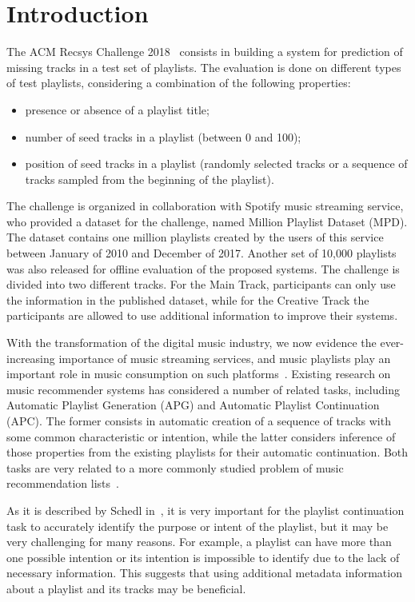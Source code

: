 \section{Introduction}

The ACM Recsys Challenge 2018~\cite{RecSysChallenge2018} consists in building a system for prediction of missing tracks in a test set of playlists. The evaluation is done on different types of test playlists, considering a combination of the following properties:
\begin{itemize}
\item presence or absence of a playlist title;
\item number of seed tracks in a playlist (between 0 and 100);
\item position of seed tracks in a playlist (randomly selected tracks or a sequence of tracks sampled from the beginning of the playlist).
\end{itemize}
The challenge is organized in collaboration with Spotify music streaming service, who provided a dataset for the challenge, named Million Playlist Dataset (MPD). The dataset contains one million playlists created by the users of this service between January of 2010 and December of 2017. Another set of 10,000 playlists was also released for offline evaluation of the proposed systems.
The challenge is divided into two different tracks. For the Main Track, participants can only use the information in the published dataset, while for the Creative Track the participants are allowed to use additional information to improve their systems.

With the transformation of the digital music industry, we now evidence the ever-increasing importance of music streaming services, and music playlists play an important role in music consumption on such platforms~\cite{hogan_2010}. Existing research on music recommender systems has considered a number of related tasks, including Automatic Playlist Generation (APG) and Automatic Playlist Continuation (APC). The former consists in automatic creation of a sequence of tracks with some common characteristic or intention, while the latter considers inference of those properties from the existing playlists for their automatic continuation. Both tasks are very related to a more commonly studied problem of music recommendation lists~\cite{schedl2015music}.

As it is described by Schedl in~\cite{schedl2018current}, it is very important for the playlist continuation task to accurately identify the purpose or intent of the playlist, but it may be very challenging for many reasons. For example, a playlist can have more than one possible intention or its intention is impossible to identify due to the lack of necessary information. This suggests that using additional metadata information about a playlist and its tracks may be beneficial.

